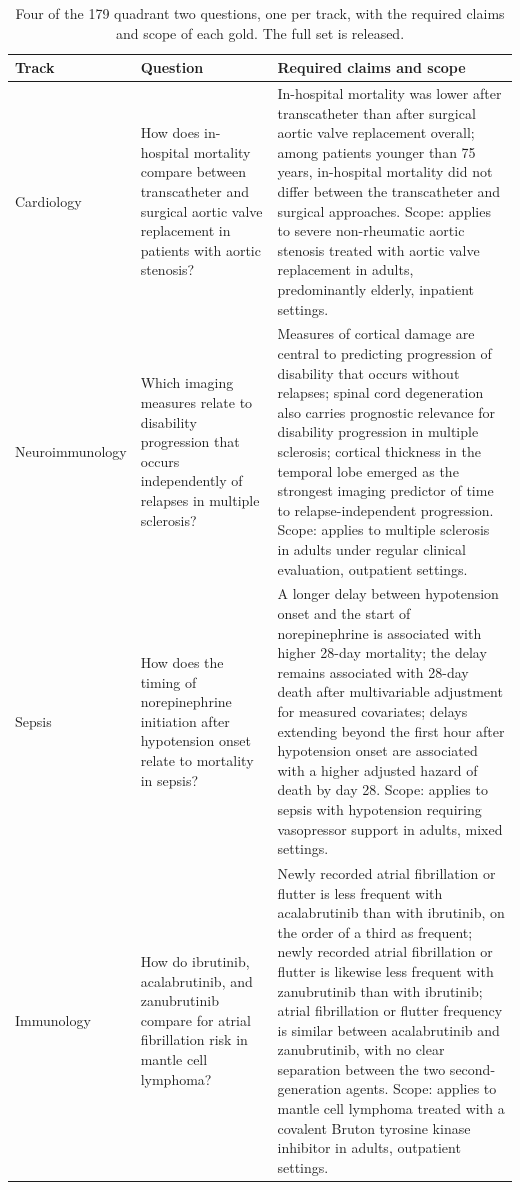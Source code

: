 \documentclass[sn-mathphys,Numbered]{sn-jnl}%
\begin{document}
\begin{appendices}
\begin{table}[h]
\caption{Four of the 179 quadrant two questions, one per track, with the required claims
and scope of each gold. The full set is released.}
\label{tab:appendix-q2-questions}
\begin{tabularx}{\textwidth}{@{}lXX@{}}
\toprule
\textbf{Track} & \textbf{Question} & \textbf{Required claims and scope} \\
\midrule
Cardiology & How does in-hospital mortality compare between transcatheter and surgical
aortic valve replacement in patients with aortic stenosis? & In-hospital mortality was
lower after transcatheter than after surgical aortic valve replacement overall; among
patients younger than 75 years, in-hospital mortality did not differ between the
transcatheter and surgical approaches. Scope: applies to severe non-rheumatic aortic
stenosis treated with aortic valve replacement in adults, predominantly elderly,
inpatient settings. \\[0.6em]
Neuroimmunology & Which imaging measures relate to disability progression that occurs
independently of relapses in multiple sclerosis? & Measures of cortical damage are
central to predicting progression of disability that occurs without relapses; spinal
cord degeneration also carries prognostic relevance for disability progression in
multiple sclerosis; cortical thickness in the temporal lobe emerged as the strongest
imaging predictor of time to relapse-independent progression. Scope: applies to multiple
sclerosis in adults under regular clinical evaluation, outpatient settings. \\[0.6em]
Sepsis & How does the timing of norepinephrine initiation after hypotension onset relate
to mortality in sepsis? & A longer delay between hypotension onset and the start of
norepinephrine is associated with higher 28-day mortality; the delay remains associated
with 28-day death after multivariable adjustment for measured covariates; delays
extending beyond the first hour after hypotension onset are associated with a higher
adjusted hazard of death by day 28. Scope: applies to sepsis with hypotension requiring
vasopressor support in adults, mixed settings. \\[0.6em]
Immunology & How do ibrutinib, acalabrutinib, and zanubrutinib compare for atrial
fibrillation risk in mantle cell lymphoma? & Newly recorded atrial fibrillation or
flutter is less frequent with acalabrutinib than with ibrutinib, on the order of a third
as frequent; newly recorded atrial fibrillation or flutter is likewise less frequent with
zanubrutinib than with ibrutinib; atrial fibrillation or flutter frequency is similar
between acalabrutinib and zanubrutinib, with no clear separation between the two
second-generation agents. Scope: applies to mantle cell lymphoma treated with a covalent
Bruton tyrosine kinase inhibitor in adults, outpatient settings. \\
\bottomrule
\end{tabularx}
\end{table}



\end{appendices}

\clearpage

\end{document}

